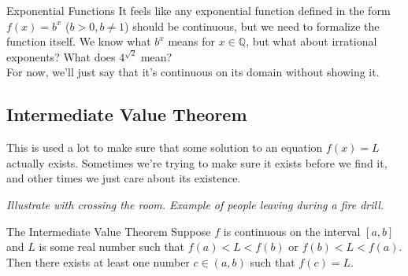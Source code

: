 \begin{defn}{Exponential Functions}
It feels like any exponential function defined in the form $f(x)=b^x$ ($b>0, b\neq1$) should be continuous, but we need to formalize the function itself. We know what $b^x$ means for $x\in\mathbb{Q}$, but what about irrational exponents? What does $4^{\sqrt{2}}$ mean?\\

For now, we'll just say that it's continuous on its domain without showing it.
\end{defn}

\subsection*{Intermediate Value Theorem}

This is used a lot to make sure that some solution to an equation $f(x)=L$ actually exists. Sometimes we're trying to make sure it exists before we find it, and other times we just care about its existence.

\textit{Illustrate with crossing the room. Example of people leaving during a fire drill.}

\begin{thm}{The Intermediate Value Theorem}
Suppose $f$ is continuous on the interval $[a,b]$ and $L$ is some real number such that $f(a)<L<f(b)$ or $f(b)<L<f(a)$. Then there exists at least one number $c\in(a,b)$ such that $f(c)=L$.
\end{thm}
